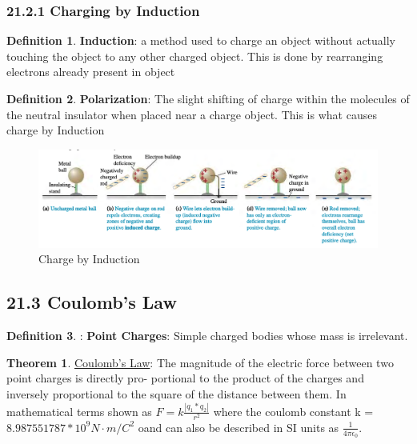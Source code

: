 \documentclass[12pt]{amsart}
\theoremstyle{definition}
\newtheorem{theorem}{Theorem}  %
\newtheorem{definition}{Definition} %
\numberwithin{equation}{theorem}    %
\begin{document}
\subsubsection*{21.2.1 Charging by Induction}

\begin{definition}
    \textbf{Induction}: 
    a method used to charge an object without actually touching the object to 
    any other charged object. This is done by rearranging electrons already 
    present in object
\end{definition}

\begin{definition}
    \textbf{Polarization}: 
    The slight shifting of charge within the molecules of the neutral insulator
    when placed near a charge object. This is what causes charge by Induction
\end{definition}

\begin{figure}[H]
    \centering
    \includegraphics[width=5in]{Media/Induction.png}
    \caption{Charge by Induction}
    \label{Charge by Induction}
\end{figure}

\subsection*{21.3 Coulomb's Law}
\begin{definition}:
    \textbf{Point Charges}: Simple charged bodies whose mass is irrelevant.
\end{definition}

\begin{theorem}
    \underline{Coulomb's Law}: The magnitude of the electric force between two 
    point charges is directly pro- portional to the product of the charges and
    inversely proportional to the square of the distance between them.
    In mathematical terms shown as $F=k\frac{|q_1*q_2|}{r^2}$ 
    where the coulomb constant k = $8.987551787*10^9 N \cdot m/C^2$ oand can 
    also be described in SI units as $\frac{1}{4\pi\epsilon_0}$.
\end{theorem}
\end{document}
